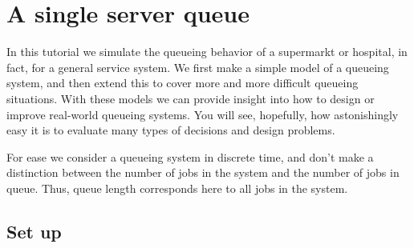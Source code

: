 \documentclass{scrartcl}
\begin{document}




\clearpage


\section{A single server queue}
\label{sec:single-server-queue}

In this tutorial we simulate the queueing behavior of a supermarkt or hospital, in fact, for a general service system. We first make a simple model of a queueing system, and then extend this to cover more and more difficult queueing situations. With these models we can provide insight into how to design or improve real-world queueing systems.  You will see, hopefully, how astonishingly easy it is to evaluate many types of decisions and design problems. 

For ease we  consider a queueing system in discrete time, and don't make a distinction between the number of jobs in the system and the number of jobs in queue. Thus, queue length corresponds here to all jobs in the system.

\subsection{Set up}
\label{sec:set-up}
\end{document}
